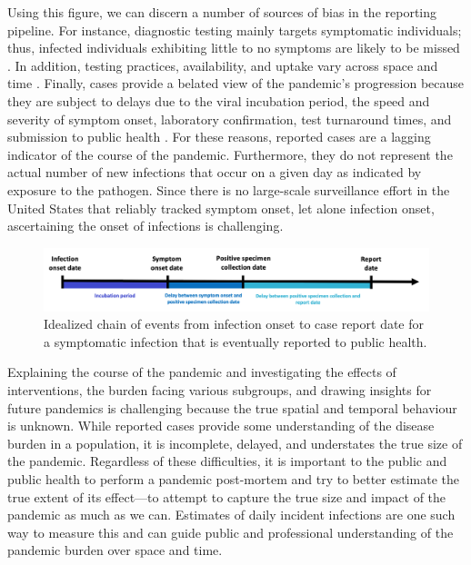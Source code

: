\documentclass{article}
\begin{document}
Using this figure, we can discern a number of sources of bias in the reporting
pipeline. For instance, diagnostic testing mainly targets symptomatic
individuals; thus, infected individuals exhibiting little to no symptoms are
likely to be missed \citep{cdc2022estimated}. In addition, testing practices,
availability, and uptake vary across space and time \citep{pitzer2021impact,
ecdc2020strategies, hitchings2021usefulness}. Finally, cases provide a belated
view of the pandemic's progression because they are subject to delays due to the
viral incubation period, the speed and severity of symptom onset, laboratory
confirmation, test turnaround times, and submission to public health
\citep{pellis2021challenges, wash2020dash}. For these reasons, reported cases
are a lagging indicator of the course of the pandemic. Furthermore, they do not
represent the actual number of new infections that occur on a given day as
indicated by exposure to the pathogen. Since there is no large-scale surveillance
effort in the United States that reliably tracked symptom onset, let alone infection onset,
ascertaining the onset of infections is challenging.

\begin{figure}[!tb]
\centering
    \includegraphics[width=.99\textwidth]{Chain_of_events_onset_report.pdf} 
    \caption{Idealized chain of events from infection onset to case report date 
    for a symptomatic infection that is eventually reported to public health.}
    \label{fig:chain_events_onset_report}
\end{figure}


Explaining the course of the pandemic and investigating the effects of
interventions, the burden facing various subgroups, and drawing insights for
future pandemics is challenging because the true spatial and temporal behaviour
is unknown. While reported cases provide some understanding of the disease
burden in a population, it is incomplete, delayed, and understates the true size
of the pandemic. Regardless of these difficulties, it is important to the public
and public health to perform a pandemic post-mortem and try to better estimate the
true extent of its effect---to attempt to capture the true size and impact of
the pandemic as much as we can. Estimates of daily incident infections are one
such way to measure this and can guide public and professional understanding of
the pandemic burden over space and time.
\end{document}

